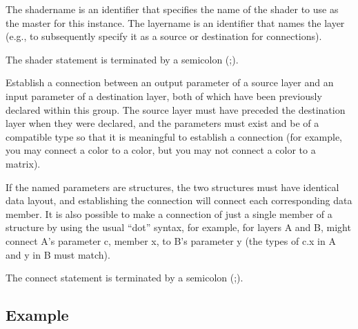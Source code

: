 \documentclass[11pt,letterpaper]{book}
\def\color{{\cf color}\xspace}
\def\matrix{{\cf matrix}\xspace}
\begin{document}
The {\cf shadername} is an identifier that specifies the name of the shader
to use as the master for this instance. The {\cf layername} is an identifier
that names the layer (e.g., to subsequently specify it as a source or
destination for connections).

The {\cf shader} statement is terminated by a semicolon ({\cf ;}).
\apiend



Establish a connection between an output parameter of a source layer and an
input parameter of a destination layer, both of which have been previously
declared within this group. The source layer must have preceded the
destination layer when they were declared, and the parameters must exist and
be of a compatible type so that it is meaningful to establish a connection
(for example, you may connect a \color to a \color, but you may not connect
a \color to a \matrix).

If the named parameters are structures, the two structures must have
identical data layout, and establishing the connection will connect each
corresponding data member.  It is also possible to make a connection of just
a single member of a structure by using the usual ``dot'' syntax, for
example, for layers {\cf A} and {\cf B},  might
connect A's parameter {\cf c}, member {\cf x}, to B's parameter {\cf y} (the
types of {\cf c.x} in A and {\cf y} in B must match).

The {\cf connect} statement is terminated by a semicolon ({\cf ;}).
\apiend

\subsection*{Example}
\end{document}
